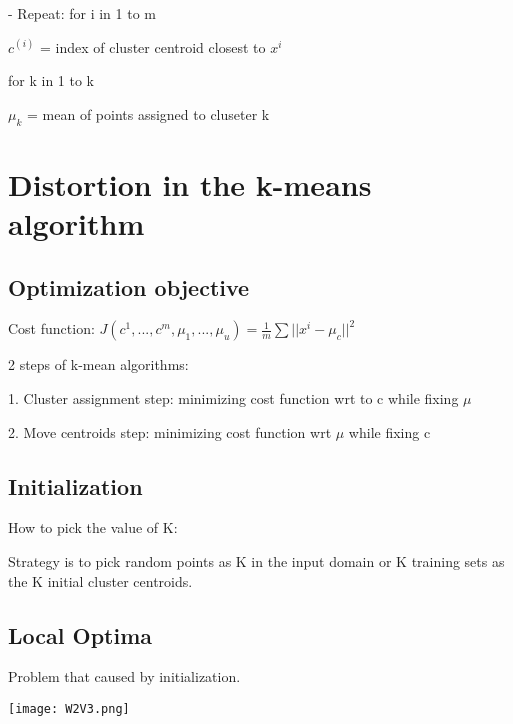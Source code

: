 \documentclass{article}
\begin{document}
- Repeat: 
    for i in 1 to m

    \hspace{1.1cm}$c^{(i)}$ = index of cluster centroid closest to $x^i$

    for k in 1 to k

    \hspace{1.1cm}$\mu_k$ = mean of points assigned to cluseter k


\section*{Distortion in the k-means algorithm}

\subsection*{Optimization objective }
Cost function: $J(c^1, ... , c^m, \mu_1, ..., \mu_u) = \frac{1}{m}\sum ||x^i -\mu_c||^2$

2 steps of k-mean algorithms:

1. Cluster assignment step: minimizing cost function wrt to c while fixing $\mu$

2. Move centroids step: minimizing cost function wrt $\mu$ while fixing c

\subsection*{Initialization}
How to pick the value of K:

                            
Strategy is to pick random points as K in the input domain or K training sets as the K initial cluster centroids. 

\subsection*{Local Optima}
Problem that caused by initialization. 

\texttt{[image: W2V3.png]}
\end{document}
